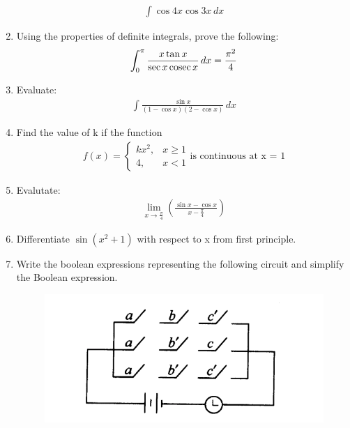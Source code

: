 \documentclass[journal,12pt,twocolumn]{IEEEtran}
\renewcommand\thesection{\arabic{section}}
\begin{document}
\begin{enumerate}[label=\thesection.\arabic*.,ref=\thesection.\theenumi]
\begin{align}
   \int \cos 4x\cos 3x\, dx 
\end{align}
\item Using the properties of definite integrals, prove the following:
\begin{align}
 \int_{0}^{\pi} \displaystyle\frac{x\tan x}{\sec x\,\text{cosec}\, x}\, dx = \displaystyle\frac{\pi^2}{4} \nonumber
\end{align}
\item Evaluate: 
\begin{align}
    \int \displaystyle\frac{\sin x}{(1-\cos x)(2-\cos x)}\, dx \nonumber
\end{align} 
\item Find the value of k if the function
\begin{align}
    f(x) =
   \left\{
\begin{array}{ll}
      kx^2, & x\geq 1 \\
      4, & x <  1 
\end{array} \right. 
\text{is continuous at x = 1} \nonumber
\end{align}

 \item Evalutate: 
 \begin{align}
    \lim_{x\to\frac{\pi}{4}} \left(\displaystyle\frac{\sin x - \cos x}{x - \displaystyle\frac{\pi}{4}}\right) \nonumber
 \end{align}
 
 \item Differentiate  $ \sin (x^2 + 1) $ with respect to x from first principle.

 \item Write the boolean expressions representing the following circuit and simplify the Boolean expression.
 \begin{figure}[h!]
   \centering
   \includegraphics[width=1\columnwidth]{1.png}
   \caption{}
\end{figure}


\end{enumerate}
\end{document}
